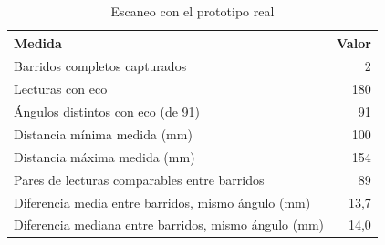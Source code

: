 \begin{table}[htbp]
\caption{Escaneo con el prototipo real}
\label{tab:real}
\begin{tabular}{lr}
\toprule
Medida & Valor \\
\midrule
Barridos completos capturados & 2 \\
Lecturas con eco & 180 \\
Ángulos distintos con eco (de 91) & 91 \\
Distancia mínima medida (mm) & 100 \\
Distancia máxima medida (mm) & 154 \\
Pares de lecturas comparables entre barridos & 89 \\
Diferencia media entre barridos, mismo ángulo (mm) & 13,7 \\
Diferencia mediana entre barridos, mismo ángulo (mm) & 14,0 \\
\bottomrule
\end{tabular}
\end{table}
